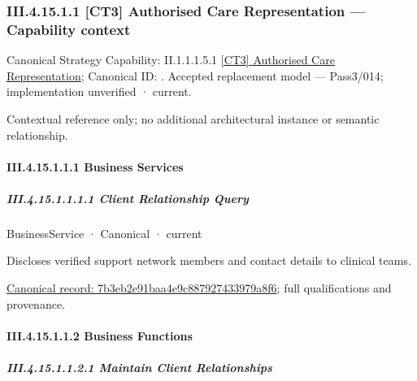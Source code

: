 \subsubsection*{III.4.15.1.1 [CT3] Authorised Care Representation — Capability context}
\label{navigation:III.4.15.1.1}

{\small Canonical Strategy Capability: II.1.1.1.5.1 \hyperref[element:a7092757af934517850ff63707397050]{[CT3] Authorised Care Representation}; Canonical ID: \texttt{}. Accepted replacement model — Pass3/014; implementation unverified · current.}\par
Contextual reference only; no additional architectural instance or semantic relationship.\par
\paragraph*{III.4.15.1.1.1 Business Services}
\label{navigation:III.4.15.1.1.1}

\subparagraph*{III.4.15.1.1.1.1 Client Relationship Query}
\label{navigation:III.4.15.1.1.1.1}

\label{element:7b3eb2e91baa4e9c887927433979a8f6}
{\small BusinessService · Canonical · current}\par

Discloses verified support network members and contact details to clinical teams.


{\footnotesize \href{../../../../../../../../continuum/business/business-service/7b3eb2e91baa4e9c887927433979a8f6.md}{Canonical record: 7b3eb2e91baa4e9c887927433979a8f6}; full qualifications and provenance.}\par
\paragraph*{III.4.15.1.1.2 Business Functions}
\label{navigation:III.4.15.1.1.2}

\subparagraph*{III.4.15.1.1.2.1 Maintain Client Relationships}
\label{navigation:III.4.15.1.1.2.1}

